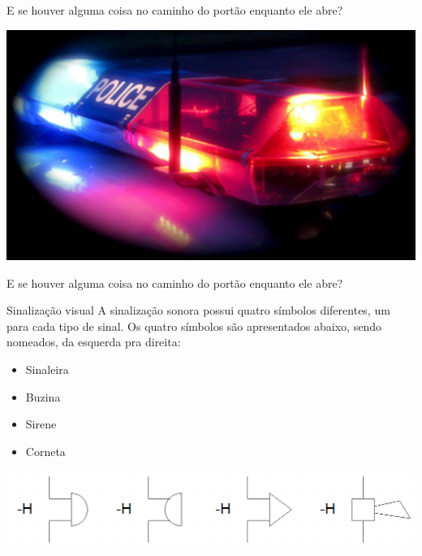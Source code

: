 \begin{frame}{E se houver alguma coisa no caminho do portão enquanto ele abre?}
	\centerline{\includegraphics[width=\linewidth]{Figuras/Ch05/fig20.jpg}}
\end{frame}



\begin{frame}{E se houver alguma coisa no caminho do portão enquanto ele abre?}
	\begin{block}{Sinalização visual}
		A sinalização sonora possui quatro símbolos diferentes, um para cada tipo de sinal. Os quatro símbolos são apresentados abaixo, sendo nomeados, da esquerda pra direita:
		
		\begin{itemize}
			\item Sinaleira
			\item Buzina
			\item Sirene
			\item Corneta
		\end{itemize}
		
	\end{block}
	
	\medskip
	
	\centerline{\includegraphics[width=0.8\linewidth]{Figuras/Ch05/fig21.jpg}}
\end{frame}

